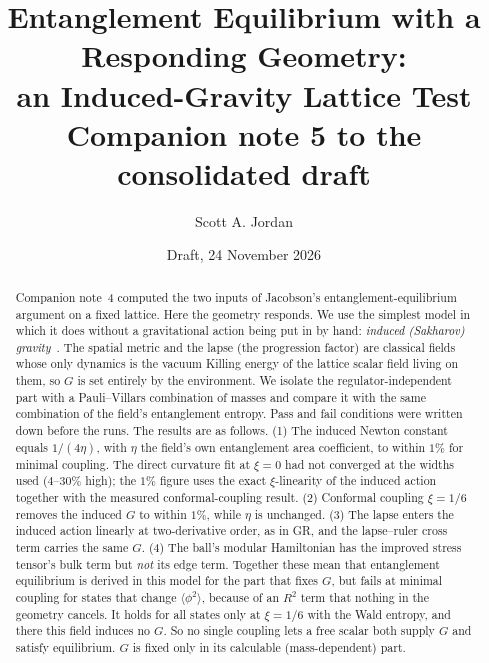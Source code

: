\documentclass[11pt]{article}
\title{Entanglement Equilibrium with a Responding Geometry:\\ an Induced-Gravity Lattice Test\\[4pt]
\large Companion note 5 to the consolidated draft}
\author{Scott A. Jordan}
\date{Draft, 24 November 2026}
\begin{document}
\sloppy
\maketitle
\begin{abstract}
Companion note~4 computed the two inputs of Jacobson's entanglement-equilibrium argument on a fixed lattice. Here the geometry responds. We use the simplest model in which it does without a gravitational action being put in by hand: \emph{induced (Sakharov) gravity}~\cite{Sakharov}. The spatial metric and the lapse (the progression factor) are classical fields whose only dynamics is the vacuum Killing energy of the lattice scalar field living on them, so $G$ is set entirely by the environment. We isolate the regulator-independent part with a Pauli--Villars combination of masses and compare it with the same combination of the field's entanglement entropy. Pass and fail conditions were written down before the runs. The results are as follows.
(1) The induced Newton constant equals $1/(4\eta)$, with $\eta$ the field's own entanglement area coefficient, to within $1\%$ for minimal coupling. The direct curvature fit at $\xi=0$ had not converged at the widths used ($4$--$30\%$ high); the $1\%$ figure uses the exact $\xi$-linearity of the induced action together with the measured conformal-coupling result.
(2) Conformal coupling $\xi=1/6$ removes the induced $G$ to within $1\%$, while $\eta$ is unchanged.
(3) The lapse enters the induced action linearly at two-derivative order, as in GR, and the lapse--ruler cross term carries the same $G$.
(4) The ball's modular Hamiltonian has the improved stress tensor's bulk term but \emph{not} its edge term.
Together these mean that entanglement equilibrium is derived in this model for the part that fixes $G$, but fails at minimal coupling for states that change $\langle\phi^2\rangle$, because of an $R^2$ term that nothing in the geometry cancels. It holds for all states only at $\xi=1/6$ with the Wald entropy, and there this field induces no $G$. So no single coupling lets a free scalar both supply $G$ and satisfy equilibrium. $G$ is fixed only in its calculable (mass-dependent) part.
\end{abstract}
\end{document}
